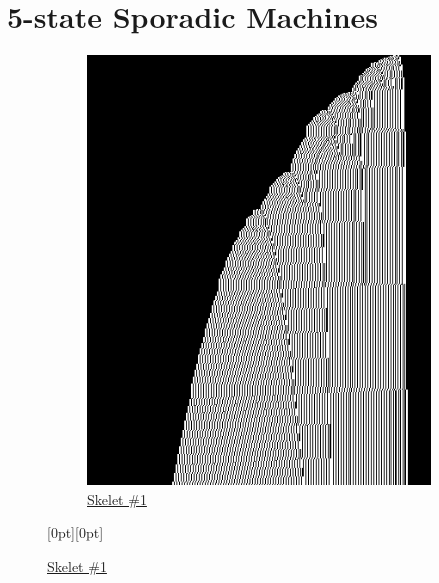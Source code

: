 \section{5-state Sporadic Machines}\label{sec:sporadic}

\begin{figure}[h!]
    \centering

    \begin{minipage}{\textwidth}
        \centering
        \begin{subfigure}{0.3\textwidth}
            \centering
            \includegraphics[width=\linewidth]{figures/sporadic-machines/sk1.png}
            \caption*{\href{https://bbchallenge.org/1RB1RD_1LC0RC_1RA1LD_0RE0LB_---1RC}{Skelet \#1}}
        \end{subfigure}
        \hfill
        \raisebox{8.5em}[0pt][0pt]{%
            \begin{minipage}{0.3\textwidth}
                \centering

\end{minipage}}
\end{minipage}
\end{figure}
